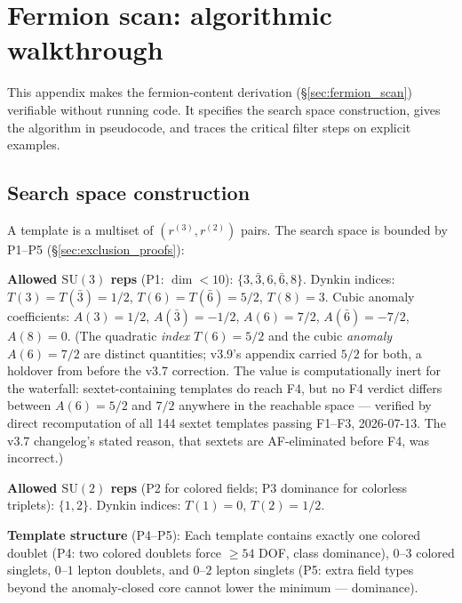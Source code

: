 \documentclass[11pt]{article}
\theoremstyle{definition}
\newcommand{\SU}{\mathrm{SU}}
\begin{document}
\section{Fermion scan: algorithmic walkthrough}
\label{app:scan_walkthrough}

This appendix makes the fermion-content derivation
(\S\ref{sec:fermion_scan}) verifiable without running code.  It
specifies the search space construction, gives the algorithm in
pseudocode, and traces the critical filter steps on explicit
examples.

\subsection{Search space construction}
\label{app:search_space}

A template is a multiset of $(r^{(3)}, r^{(2)})$ pairs.  The
search space is bounded by P1--P5 (\S\ref{sec:exclusion_proofs}):

\smallskip\noindent\textbf{Allowed $\SU(3)$ reps} (P1: $\dim < 10$):
$\{3, \bar{3}, 6, \bar{6}, 8\}$.
Dynkin indices: $T(3) = T(\bar{3}) = 1/2$, $T(6) = T(\bar{6}) = 5/2$,
$T(8) = 3$.  Cubic anomaly coefficients: $A(3) = 1/2$,
$A(\bar{3}) = -1/2$, $A(6) = 7/2$, $A(\bar{6}) = -7/2$, $A(8) = 0$.
(The quadratic \emph{index} $T(6) = 5/2$ and the cubic \emph{anomaly}
$A(6) = 7/2$ are distinct quantities; v3.9's appendix carried $5/2$
for both, a holdover from before the v3.7 correction.  The value is
computationally inert for the waterfall: sextet-containing templates
do reach F4, but no F4 verdict differs between $A(6) = 5/2$ and $7/2$
anywhere in the reachable space --- verified by direct recomputation
of all 144 sextet templates passing F1--F3, 2026-07-13.  The v3.7
changelog's stated reason, that sextets are AF-eliminated before F4,
was incorrect.)

\smallskip\noindent\textbf{Allowed $\SU(2)$ reps} (P2 for colored
fields; P3 dominance for colorless triplets): $\{1, 2\}$.  Dynkin indices: $T(1) = 0$, $T(2) = 1/2$.

\smallskip\noindent\textbf{Template structure} (P4--P5):
Each template contains exactly one colored doublet (P4: two colored
doublets force $\ge 54$ DOF, class dominance), $0$--$3$ colored
singlets, $0$--$1$
lepton doublets, and $0$--$2$ lepton singlets (P5: extra field types
beyond the anomaly-closed core cannot lower the minimum ---
dominance).
\end{document}
